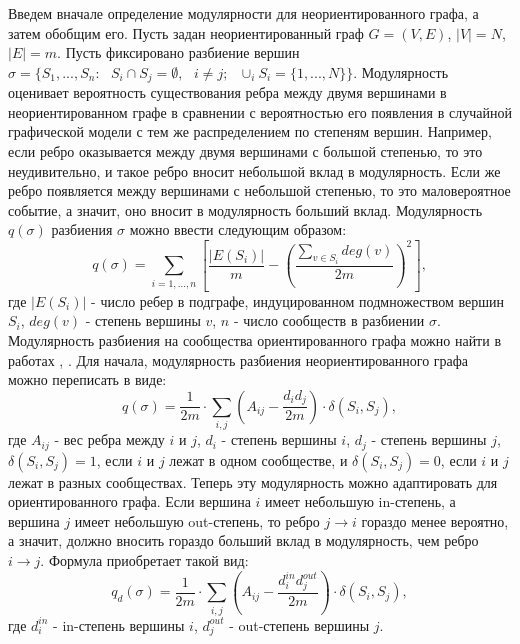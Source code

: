 Введем вначале определение модулярности для неориентированного графа, а затем обобщим его. Пусть задан неориентированный граф $G=(V,E)$, $|V|=N$, $|E|=m$. Пусть фиксировано разбиение вершин  $\sigma=\{S_1,...,S_n:\textbf{ }S_i\cap S_j=\emptyset,\textbf{ }i\neq j;\textbf{ }\cup_i S_i=\{1,...,N\}\}$. Модулярность оценивает вероятность существования ребра между двумя вершинами в неориентированном графе в сравнении с вероятностью его появления в случайной графической модели с тем же распределением по степеням вершин. Например, если ребро оказывается между двумя вершинами с большой степенью, то это неудивительно, и такое ребро вносит небольшой вклад в модулярность. Если же ребро появляется между вершинами с небольшой степенью, то это маловероятное событие, а значит, оно вносит в модулярность больший вклад. Модулярность $q(\sigma)$ разбиения $\sigma$ можно ввести следующим образом:
\begin{equation}
q(\sigma)=\sum_{i=1,\dots,n} [\frac{|E(S_i)|}{m}-(\frac{\sum_{v\in S_i} deg(v)}{2m})^2],
\end{equation}
где $|E(S_i)|$ - число ребер в подграфе, индуцированном подмножеством вершин $S_i$, $deg(v)$ - степень вершины $v$, $n$ - число сообществ в разбиении $\sigma$.\\

Модулярность разбиения на сообщества ориентированного графа можно найти в работах \cite{newmandir}, \cite{louvain}. Для начала, модулярность разбиения неориентированного графа можно переписать в виде:
\begin{equation}
q(\sigma) = \frac{1}{2m}\cdot \sum_{i,j} (A_{ij}-\frac{d_id_j}{2m})\cdot\delta(S_i, S_j),
\end{equation}
где $A_{ij}$ - вес ребра между $i$ и $j$, $d_i$ - степень вершины $i$, $d_j$ - степень вершины $j$, $\delta(S_i, S_j)=1$, если $i$ и $j$ лежат в одном сообществе, и $\delta(S_i, S_j)=0$, если $i$ и $j$ лежат в разных сообществах. Теперь эту модулярность можно адаптировать для ориентированного графа. Если вершина $i$ имеет небольшую in-степень, а вершина $j$ имеет небольшую out-степень, то ребро $j \rightarrow i$ гораздо менее вероятно, а значит, должно вносить гораздо больший вклад в модулярность, чем ребро $i \rightarrow j$. Формула приобретает такой вид:
\begin{equation}
q_d(\sigma) = \frac{1}{2m}\cdot \sum_{i,j} (A_{ij}-\frac{d_i^{in}d_j^{out}}{2m})\cdot\delta(S_i, S_j),
\end{equation}
где $d_i^{in}$ - in-степень вершины $i$, $d_j^{out}$ - out-степень вершины $j$. \\

